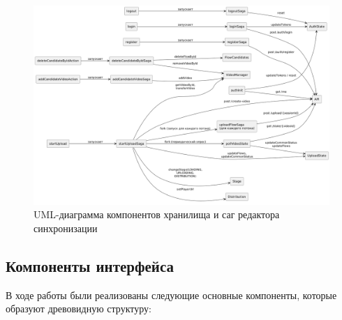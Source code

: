 	\begin{figure}[ht!] 
		\center
		\includegraphics [scale=0.33] {my_folder/images//uml_sync_sagas_store}
		\caption{UML-диаграмма компонентов хранилища и саг редактора синхронизации} 
		\label{fig:uml_sync_sagas_store}  
	\end{figure}

	\subsection{Компоненты интерфейса}

	В ходе работы были реализованы следующие основные компоненты, которые образуют древовидную структуру:
	
